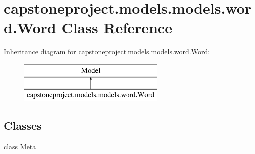 \hypertarget{classcapstoneproject_1_1models_1_1models_1_1word_1_1_word}{}\section{capstoneproject.\+models.\+models.\+word.\+Word Class Reference}
\label{classcapstoneproject_1_1models_1_1models_1_1word_1_1_word}
Inheritance diagram for capstoneproject.\+models.\+models.\+word.\+Word\+:\begin{figure}[H]
\begin{center}
\leavevmode
\includegraphics[height=2.000000cm]{classcapstoneproject_1_1models_1_1models_1_1word_1_1_word}
\end{center}
\end{figure}
\subsection*{Classes}
\begin{DoxyCompactItemize}
\item 
class \mbox{\hyperlink{classcapstoneproject_1_1models_1_1models_1_1word_1_1_word_1_1_meta}{Meta}}
\end{DoxyCompactItemize}
